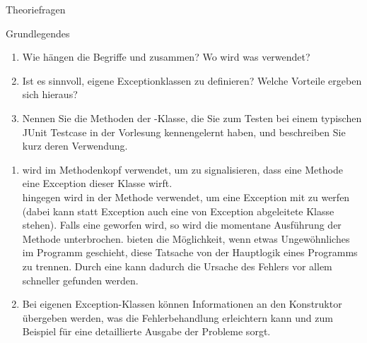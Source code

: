 \documentclass{../tuda-exercise}
\begin{document}
  \maketitle

  \begin{task}[credit=\stars{0}{3}]{Theoriefragen}
    \begin{subtask*}{Grundlegendes}
      \begin{enumerate}
        \item Wie hängen die Begriffe  und  zusammen? Wo
        wird was verwendet?
        \item Ist es sinnvoll, eigene Exceptionklassen zu definieren? Welche Vorteile ergeben
        sich hieraus?
        \item Nennen Sie die Methoden der -Klasse, die Sie zum Testen bei
        einem typischen JUnit
        Testcase in der Vorlesung kennengelernt haben, und beschreiben Sie kurz deren Verwendung.
      \end{enumerate}

      \begin{solution}
        \begin{enumerate}
          \item {} wird im Methodenkopf verwendet, um zu signalisieren, dass
          eine Methode eine Exception dieser Klasse wirft.
          \\
           hingegen wird in der Methode verwendet, um eine Exception mit
           zu werfen (dabei kann statt Exception auch eine von
          Exception abgeleitete Klasse stehen). Falls eine  geworfen wird,
          so wird die momentane Ausführung der Methode unterbrochen. 
          bieten die Möglichkeit, wenn etwas Ungewöhnliches im Programm geschieht, diese Tatsache
          von der Hauptlogik eines Programms zu trennen. Durch eine  kann
          dadurch die Ursache des Fehlers vor allem schneller gefunden werden.
          \item Bei eigenen Exception-Klassen können Informationen an den Konstruktor übergeben
          werden, was die Fehlerbehandlung erleichtern kann und zum Beispiel für eine
          detaillierte Ausgabe der Probleme sorgt.

          \br


\end{enumerate}
\end{solution}
\end{subtask*}
\end{task}
\end{document}
